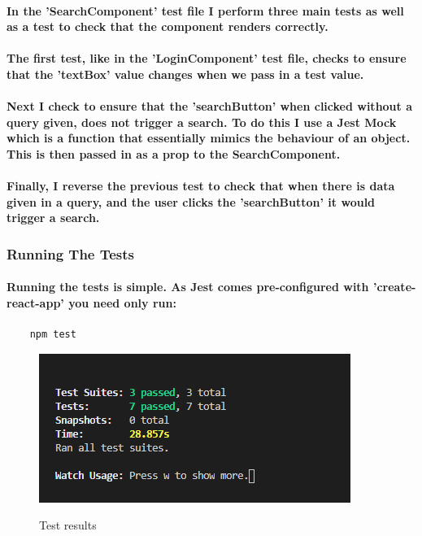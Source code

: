 \paragraph{In the 'SearchComponent' test file I perform three main tests as well as a test to check that the component renders correctly.}
\paragraph{The first test, like in the 'LoginComponent' test file, checks to ensure that the 'textBox' value changes when we pass in a test value.}
\paragraph{Next I check to ensure that the 'searchButton' when clicked without a query given, does not trigger a search. To do this I use a Jest Mock which is a function that essentially mimics the behaviour of an object. This is then passed in as a prop to the SearchComponent.}

\paragraph{Finally, I reverse the previous test to check that when there is data given in a query, and the user clicks the 'searchButton' it would trigger a search.}

\subsubsection{Running The Tests}
\paragraph{Running the tests is simple. As Jest comes pre-configured with 'create-react-app' you need only run:}
\begin{verbatim}
    npm test
\end{verbatim}
\begin{figure}[ht]
    \centering
    \includegraphics[scale=0.9]{Images/test2.png} 
    \label{test2_label}
    \caption{Test results}
\end{figure}